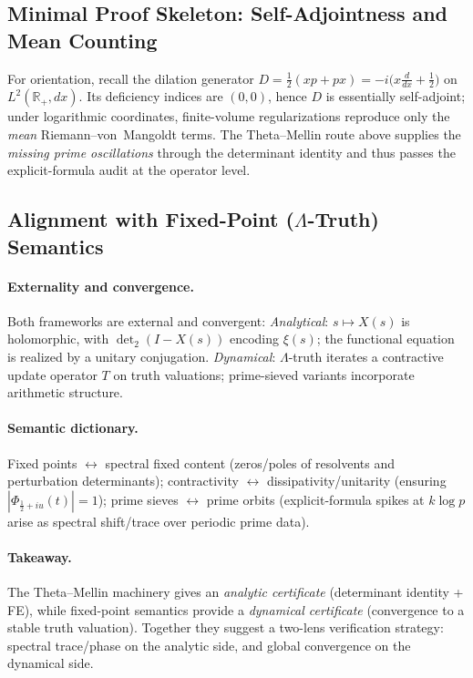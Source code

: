 \documentclass[11pt]{article}
\numberwithin{equation}{section}
\theoremstyle{definition}
\theoremstyle{remark}
\newcommand{\1}{\mathbbm{1}}
\begin{document}
\subsection{Minimal Proof Skeleton: Self-Adjointness and Mean Counting}

For orientation, recall the dilation generator \(D=\tfrac12(xp+px)=-i\big(x\tfrac{d}{dx}+\tfrac12\big)\) on \(L^2(\mathbb{R}_+,dx)\).
Its deficiency indices are \((0,0)\), hence \(D\) is essentially self-adjoint; under logarithmic coordinates, finite-volume regularizations reproduce only the \emph{mean} Riemann–von~Mangoldt terms.
The Theta–Mellin route above supplies the \emph{missing prime oscillations} through the determinant identity and thus passes the explicit-formula audit at the operator level.

\subsection{Alignment with Fixed-Point (\texorpdfstring{$\Lambda$}{Λ}-Truth) Semantics}

\paragraph{Externality and convergence.}
Both frameworks are external and convergent:
\emph{Analytical}: \(s\mapsto X(s)\) is holomorphic, with \(\det_2(I-X(s))\) encoding \(\xi(s)\); the functional equation is realized by a unitary conjugation.
\emph{Dynamical}: \(\Lambda\)-truth iterates a contractive update operator \(T\) on truth valuations; prime-sieved variants incorporate arithmetic structure.

\paragraph{Semantic dictionary.}
Fixed points \(\leftrightarrow\) spectral fixed content (zeros/poles of resolvents and perturbation determinants);
contractivity \(\leftrightarrow\) dissipativity/unitarity (ensuring \(|\Phi_{\frac12+iu}(t)|=1\));
prime sieves \(\leftrightarrow\) prime orbits (explicit-formula spikes at \(k\log p\) arise as spectral shift/trace over periodic prime data).

\paragraph{Takeaway.}
The Theta–Mellin machinery gives an \emph{analytic certificate} (determinant identity + FE),
while fixed-point semantics provide a \emph{dynamical certificate} (convergence to a stable truth valuation).
Together they suggest a two-lens verification strategy: spectral trace/phase on the analytic side, and global convergence on the dynamical side.
\end{document}
